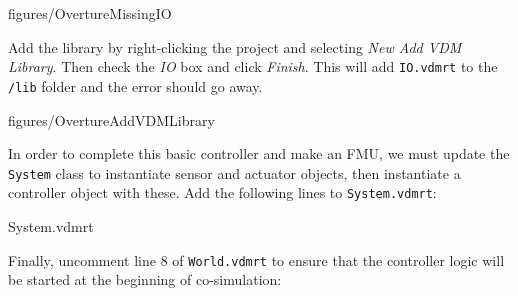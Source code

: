 \documentclass[11pt,a4paper]{../tutorial}
\begin{document}
\begin{instructions}
    \begin{annotation}[width=0.99\linewidth,trim=0 220 0 250,clip]{figures/OvertureMissingIO}
    \end{annotation}

    Add the library by right-clicking the project and selecting \emph{New \menusep{} Add VDM Library}. Then check the \emph{IO} box and click \emph{Finish}. This will add \texttt{IO.vdmrt} to the \texttt{/lib} folder and the error should go away.

    \begin{annotation}[width=0.99\linewidth,trim=0 300 0 0,clip]{figures/OvertureAddVDMLibrary}
    \end{annotation}

\item In order to complete this basic controller and make an FMU, we must update the \texttt{System} class to instantiate sensor and actuator objects, then instantiate a controller object with these. Add the following lines to \texttt{System.vdmrt}:

    \bigskip
    
    {System.vdmrt}

\item Finally, uncomment line 8 of \texttt{World.vdmrt} to ensure that the controller logic will be started at the beginning of co-simulation:


\end{instructions}
\end{document}
